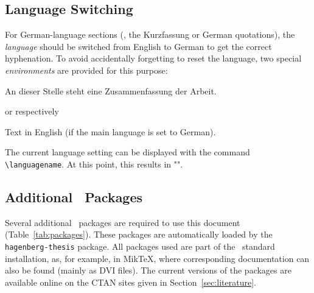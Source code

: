 \subsection{Language Switching}
\label{sec:language-switching}

For German-language sections (\eg, the Kurzfassung or German quotations), the
\emph{language} should be switched from English to German to get the correct
hyphenation. To avoid accidentally forgetting to reset the language, two special
\emph{environments} are provided for this purpose:
%
\begin{LaTeXCode}[numbers=none]
\begin{german}
    An dieser Stelle steht eine Zusammenfassung der Arbeit.
\end{german}
\end{LaTeXCode}
%
or respectively
%
\begin{LaTeXCode}[numbers=none]
\begin{english}
    Text in English (if the main language is set to German).
\end{english}
\end{LaTeXCode}
%
The current language setting can be displayed with the command
\verb!\languagename!. At this point, this results in
"\texttt{\languagename}".

\subsection{Additional \latex\ Packages}

Several additional \latex\ packages are required to use this document
(Table~\ref{tab:packages}). These packages are automatically loaded by the
\texttt{hagenberg-thesis} package. All packages used are part of the \latex\
standard installation, as, for example, in MikTeX, where corresponding
documentation can also be found (mainly as DVI files). The current versions of
the packages are available online on the CTAN sites given in
Section~\ref{sec:literature}.

